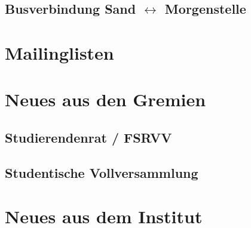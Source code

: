 \documentclass{fsinewsletter}
\begin{document}
\subsection{Busverbindung Sand $\leftrightarrow$ Morgenstelle}


\vfill
\newpage

\section{Mailinglisten}


\section{Neues aus den Gremien}


\subsection{Studierendenrat / FSRVV}


\subsection{Studentische Vollversammlung}



\vfill
\newpage


\section{Neues aus dem Institut}
\end{document}
